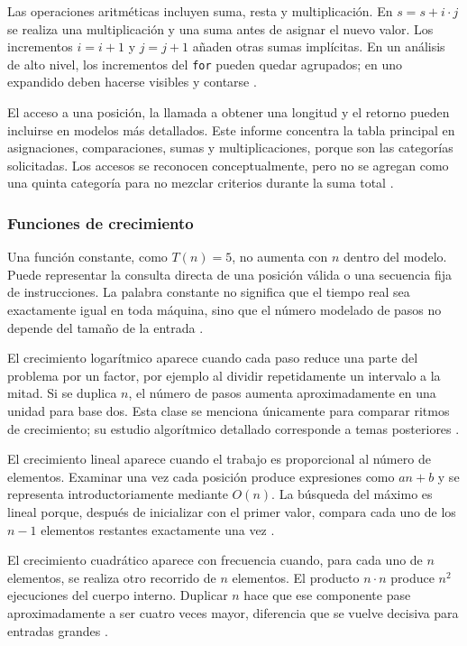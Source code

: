 \documentclass[12pt,letterpaper]{article}
\newcommand{\codigo}[1]{\texttt{#1}}
\begin{document}
Las operaciones aritméticas incluyen suma, resta y multiplicación. En $s=s+i\cdot j$ se realiza una multiplicación y una suma antes de asignar el nuevo valor. Los incrementos $i=i+1$ y $j=j+1$ añaden otras sumas implícitas. En un análisis de alto nivel, los incrementos del \codigo{for} pueden quedar agrupados; en uno expandido deben hacerse visibles y contarse \citep{zanabria2026,cormen2022,skiena2020}.

El acceso a una posición, la llamada a obtener una longitud y el retorno pueden incluirse en modelos más detallados. Este informe concentra la tabla principal en asignaciones, comparaciones, sumas y multiplicaciones, porque son las categorías solicitadas. Los accesos se reconocen conceptualmente, pero no se agregan como una quinta categoría para no mezclar criterios durante la suma total \citep{cook1973,cormen2022,zanabria2026}.

\subsubsection{Funciones de crecimiento}

Una función constante, como $T(n)=5$, no aumenta con $n$ dentro del modelo. Puede representar la consulta directa de una posición válida o una secuencia fija de instrucciones. La palabra constante no significa que el tiempo real sea exactamente igual en toda máquina, sino que el número modelado de pasos no depende del tamaño de la entrada \citep{cormen2022,sedgewick2011,skiena2020}.

El crecimiento logarítmico aparece cuando cada paso reduce una parte del problema por un factor, por ejemplo al dividir repetidamente un intervalo a la mitad. Si se duplica $n$, el número de pasos aumenta aproximadamente en una unidad para base dos. Esta clase se menciona únicamente para comparar ritmos de crecimiento; su estudio algorítmico detallado corresponde a temas posteriores \citep{cormen2022,sedgewick2011,knuth1976}.

El crecimiento lineal aparece cuando el trabajo es proporcional al número de elementos. Examinar una vez cada posición produce expresiones como $an+b$ y se representa introductoriamente mediante $O(n)$. La búsqueda del máximo es lineal porque, después de inicializar con el primer valor, compara cada uno de los $n-1$ elementos restantes exactamente una vez \citep{cormen2022,goodrichpy2013,skiena2020}.

El crecimiento cuadrático aparece con frecuencia cuando, para cada uno de $n$ elementos, se realiza otro recorrido de $n$ elementos. El producto $n\cdot n$ produce $n^2$ ejecuciones del cuerpo interno. Duplicar $n$ hace que ese componente pase aproximadamente a ser cuatro veces mayor, diferencia que se vuelve decisiva para entradas grandes \citep{cormen2022,sedgewick2011,skiena2020}.
\end{document}
